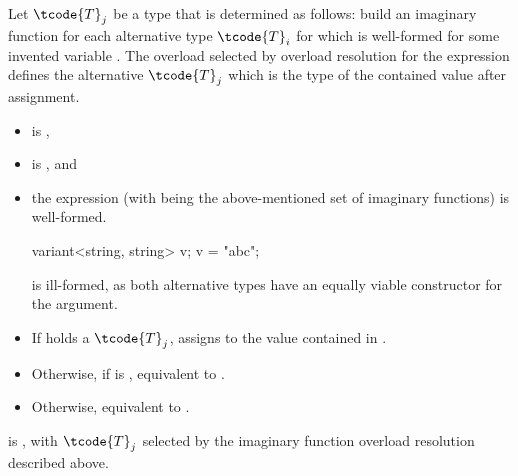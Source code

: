 \begin{itemdescr}
\pnum
Let $\tcode{T}_j$ be a type that is determined as follows:
build an imaginary function 
for each alternative type $\tcode{T}_i$
for which  
is well-formed for some invented variable .
The overload  selected by overload
resolution for the expression  defines
the alternative $\tcode{T}_j$ which is the type of the contained value after
assignment.

\pnum
\constraints
\begin{itemize}
\item
{} is ,

\item
{}
is , and

\item
the expression 
(with  being the above-mentioned set
of imaginary functions) is well-formed.
\begin{note}
\begin{codeblock}
variant<string, string> v;
v = "abc";
\end{codeblock}
is ill-formed, as both alternative types have an equally viable constructor
for the argument.
\end{note}
\end{itemize}

\pnum
\effects
\begin{itemize}
\item
If  holds a $\tcode{T}_j$, assigns  to
the value contained in .
\item
Otherwise, if 
 is ,
equivalent to .
\item
Otherwise, equivalent to .
\end{itemize}

\pnum
\ensures
{} is , with $\tcode{T}_j$
selected by the imaginary function overload resolution described above.


\end{itemdescr}
